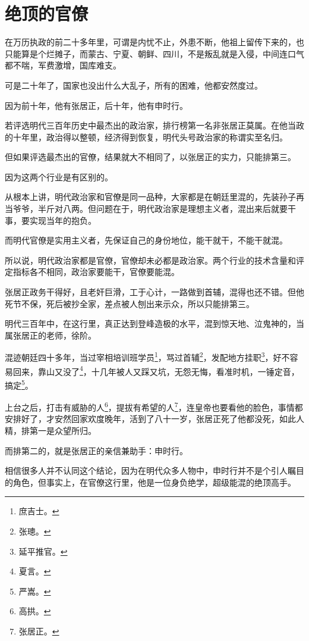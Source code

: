 \section{绝顶的官僚}
\ifnum{}
	\begin{multicols}{\theparacolNo}
\fi
在万历执政的前二十多年里，可谓是内忧不止，外患不断，他祖上留传下来的，也只能算是个烂摊子，而蒙古、宁夏、朝鲜、四川，不是叛乱就是入侵，中间连口气都不喘，军费激增，国库难支。

可是二十年了，国家也没出什么大乱子，所有的困难，他都安然度过。

因为前十年，他有张居正，后十年，他有申时行。

若评选明代三百年历史中最杰出的政治家，排行榜第一名非张居正莫属。在他当政的十年里，政治得以整顿，经济得到恢复，明代头号政治家的称谓实至名归。

但如果评选最杰出的官僚，结果就大不相同了，以张居正的实力，只能排第三。

因为这两个行业是有区别的。

从根本上讲，明代政治家和官僚是同一品种，大家都是在朝廷里混的，先装孙子再当爷爷，半斤对八两。但问题在于，明代政治家是理想主义者，混出来后就要干事，要实现当年的抱负。

而明代官僚是实用主义者，先保证自己的身份地位，能干就干，不能干就混。

所以说，明代政治家都是官僚，官僚却未必都是政治家。两个行业的技术含量和评定指标各不相同，政治家要能干，官僚要能混。

张居正政务干得好，且老奸巨滑，工于心计，一路做到首辅，混得也还不错。但他死节不保，死后被抄全家，差点被人刨出来示众，所以只能排第三。

明代三百年中，在这行里，真正达到登峰造极的水平，混到惊天地、泣鬼神的，当属张居正的老师，徐阶。

混迹朝廷四十多年，当过宰相培训班学员\footnote{庶吉士。}，骂过首辅\footnote{张璁。}，发配地方挂职\footnote{延平推官。}，好不容易回来，靠山又没了\footnote{夏言。}，十几年被人又踩又坑，无怨无悔，看准时机，一锤定音，搞定\footnote{严嵩。}。

上台之后，打击有威胁的人\footnote{高拱。}，提拔有希望的人\footnote{张居正。}，连皇帝也要看他的脸色，事情都安排好了，才安然回家欢度晚年，活到了八十一岁，张居正死了他都没死，如此人精，排第一是众望所归。

而排第二的，就是张居正的亲信兼助手：申时行。

相信很多人并不认同这个结论，因为在明代众多人物中，申时行并不是个引人瞩目的角色，但事实上，在官僚这行里，他是一位身负绝学，超级能混的绝顶高手。


\end{multicols}
